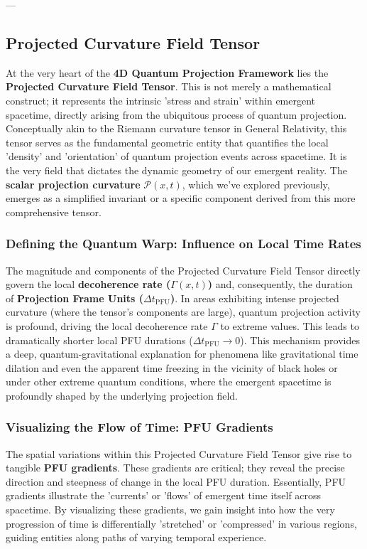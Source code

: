 \documentclass[12pt,a4paper]{article}
\numberwithin{equation}{section}
\begin{document}
---

\subsection{Projected Curvature Field Tensor}
At the very heart of the \textbf{4D Quantum Projection Framework} lies the \textbf{Projected Curvature Field Tensor}. This is not merely a mathematical construct; it represents the intrinsic 'stress and strain' within emergent spacetime, directly arising from the ubiquitous process of quantum projection. Conceptually akin to the Riemann curvature tensor in General Relativity, this tensor serves as the fundamental geometric entity that quantifies the local 'density' and 'orientation' of quantum projection events across spacetime. It is the very field that dictates the dynamic geometry of our emergent reality. The \textbf{scalar projection curvature} $\mathcal{P}(x, t)$, which we've explored previously, emerges as a simplified invariant or a specific component derived from this more comprehensive tensor.

\subsubsection{Defining the Quantum Warp: Influence on Local Time Rates}
The magnitude and components of the Projected Curvature Field Tensor directly govern the local \textbf{decoherence rate ($\Gamma(x, t)$)} and, consequently, the duration of \textbf{Projection Frame Units ($\Delta t_{\text{PFU}}$)}. In areas exhibiting intense projected curvature (where the tensor's components are large), quantum projection activity is profound, driving the local decoherence rate $\Gamma$ to extreme values. This leads to dramatically shorter local PFU durations ($\Delta t_{\text{PFU}} \to 0$). This mechanism provides a deep, quantum-gravitational explanation for phenomena like gravitational time dilation and even the apparent time freezing in the vicinity of black holes or under other extreme quantum conditions, where the emergent spacetime is profoundly shaped by the underlying projection field.

\subsubsection{Visualizing the Flow of Time: PFU Gradients}
The spatial variations within this Projected Curvature Field Tensor give rise to tangible \textbf{PFU gradients}. These gradients are critical; they reveal the precise direction and steepness of change in the local PFU duration. Essentially, PFU gradients illustrate the 'currents' or 'flows' of emergent time itself across spacetime. By visualizing these gradients, we gain insight into how the very progression of time is differentially 'stretched' or 'compressed' in various regions, guiding entities along paths of varying temporal experience.
\end{document}
